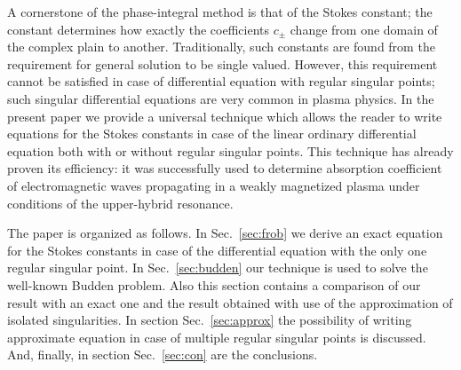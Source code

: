 \documentclass{ws-m3as}
\newcommand\sref[1]{Sec.~\ref{#1}}
\begin{document}
A cornerstone of the phase-integral method is that of the Stokes constant\cite{heading,rwbook}; 
the constant determines how exactly the coefficients $c_\pm$ change from one domain of the complex plain to another. 
Traditionally, such constants are found from the requirement for general solution to be single 
valued\cite{frpaper}. However, this requirement 
cannot be satisfied in case of differential equation with regular singular points\cite{cbbook}; such singular 
differential equations are very common in plasma physics\cite{gosp17}. ​In the present paper we provide a universal 
technique which allows the reader to write equations for the Stokes constants in case of the linear ordinary 
differential equation both with or without regular singular points. 
This technique has already proven its efficiency: it was successfully used to 
determine absorption coefficient of electromagnetic waves propagating in a weakly magnetized plasma 
under conditions of the upper-hybrid resonance\cite{kut17}.

The paper is organized as follows.
In \sref{sec:frob} we derive an exact equation for the Stokes constants in case of the differential
equation with the only one regular singular point. 
In \sref{sec:budden} our technique is used to solve the well-known Budden problem. Also this
section contains a comparison of our result with an exact one and the result obtained with use
of the approximation of isolated singularities.
In section \sref{sec:approx} the possibility of writing approximate equation in case of multiple 
regular singular points is discussed.
And, finally, in section \sref{sec:con} are the conclusions. 
\end{document}
